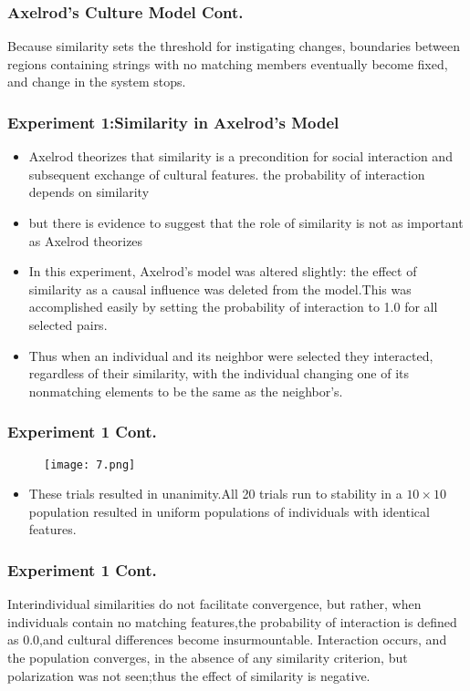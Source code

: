 \documentclass[CJK]{beamer}
\begin{document}
\begin{CJK*}{GBK}{song}
\begin{frame}
\frametitle{Axelrod's Culture Model Cont.}
Because similarity sets the threshold for instigating changes, boundaries between regions containing strings with no matching members eventually become fixed, and change in the system stops.
\end{frame}

\begin{frame}
\frametitle{Experiment 1:Similarity in Axelrod's Model}
\begin{itemize}
\item{Axelrod theorizes that similarity is a precondition for social interaction and subsequent exchange of cultural features. the probability of interaction depends on similarity}
\item{but there is evidence to suggest that the role of similarity is not as important as Axelrod theorizes}
\item{In this experiment, Axelrod's model was altered slightly: the effect of similarity as a causal influence was deleted from the model.This was accomplished easily by setting the probability of interaction to 1.0 for all selected pairs.}
\item{Thus when an individual and its neighbor were selected they interacted, regardless of their similarity, with the individual changing one of its nonmatching elements to be the same as the neighbor's. }
\end{itemize}
\end{frame}

\begin{frame}
\frametitle{Experiment 1 Cont.}
\begin{figure}
\texttt{[image: 7.png]}
\end{figure}
\begin{itemize}
\item{These trials resulted in unanimity.All 20 trials run to stability in a $10\times10$ population resulted in uniform populations of individuals with identical features.}
\end{itemize}
\end{frame}

\begin{frame}
\frametitle{Experiment 1 Cont.}
 Interindividual similarities do not facilitate convergence, but rather, when individuals contain no matching features,the probability of interaction is defined as 0.0,and cultural differences become insurmountable. Interaction occurs, and the population converges, in the absence of any similarity criterion, but polarization was not seen;thus the effect of similarity is negative.
\end{frame}


\end{CJK*}
\end{document}
